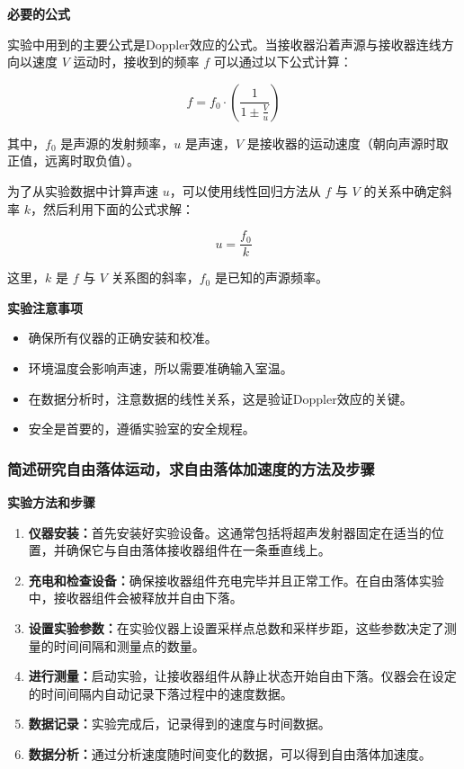 \documentclass[dvipsnames, svgnames,a4paper,11pt]{article}
\begin{document}
	\textbf{必要的公式}
	
	实验中用到的主要公式是Doppler效应的公式。当接收器沿着声源与接收器连线方向以速度 \( V \) 运动时，接收到的频率 \( f \) 可以通过以下公式计算：
	
	\[ f = f_0 \cdot \left( \frac{1}{1 \pm \frac{V}{u}} \right) \]
	
	其中，\( f_0 \) 是声源的发射频率，\( u \) 是声速，\( V \) 是接收器的运动速度（朝向声源时取正值，远离时取负值）。
	
	为了从实验数据中计算声速 \( u \)，可以使用线性回归方法从 \( f \) 与 \( V \) 的关系中确定斜率 \( k \)，然后利用下面的公式求解：
	
	\[ u = \frac{f_0}{k} \]
	
	这里，\( k \) 是 \( f \) 与 \( V \) 关系图的斜率，\( f_0 \) 是已知的声源频率。
	
	\textbf{实验注意事项}
	
	\begin{itemize}
		\item 确保所有仪器的正确安装和校准。
		\item 环境温度会影响声速，所以需要准确输入室温。
		\item 在数据分析时，注意数据的线性关系，这是验证Doppler效应的关键。
		\item 安全是首要的，遵循实验室的安全规程。
	\end{itemize}
	
	\subsubsection{简述研究自由落体运动，求自由落体加速度的方法及步骤}
	\textbf{实验方法和步骤}
	
	\begin{enumerate}
		\item \textbf{仪器安装：}首先安装好实验设备。这通常包括将超声发射器固定在适当的位置，并确保它与自由落体接收器组件在一条垂直线上。
		
		\item \textbf{充电和检查设备：}确保接收器组件充电完毕并且正常工作。在自由落体实验中，接收器组件会被释放并自由下落。
		
		\item \textbf{设置实验参数：}在实验仪器上设置采样点总数和采样步距，这些参数决定了测量的时间间隔和测量点的数量。
		
		\item \textbf{进行测量：}启动实验，让接收器组件从静止状态开始自由下落。仪器会在设定的时间间隔内自动记录下落过程中的速度数据。
		
		\item \textbf{数据记录：}实验完成后，记录得到的速度与时间数据。
		
		\item \textbf{数据分析：}通过分析速度随时间变化的数据，可以得到自由落体加速度。
	\end{enumerate}
	
\end{document}
